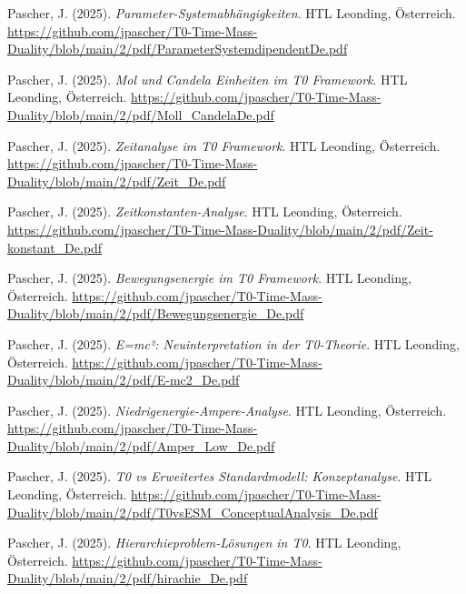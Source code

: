 \documentclass{article}
\begin{document}
\begin{thebibliography}{99}
		Pascher, J. (2025).
		\textit{Parameter-Systemabhängigkeiten}.
		HTL Leonding, Österreich.
		\url{https://github.com/jpascher/T0-Time-Mass-Duality/blob/main/2/pdf/ParameterSystemdipendentDe.pdf}
		
		Pascher, J. (2025).
		\textit{Mol und Candela Einheiten im T0 Framework}.
		HTL Leonding, Österreich.
		\url{https://github.com/jpascher/T0-Time-Mass-Duality/blob/main/2/pdf/Moll_CandelaDe.pdf}
		
		
		Pascher, J. (2025).
		\textit{Zeitanalyse im T0 Framework}.
		HTL Leonding, Österreich.
		\url{https://github.com/jpascher/T0-Time-Mass-Duality/blob/main/2/pdf/Zeit_De.pdf}
		
		Pascher, J. (2025).
		\textit{Zeitkonstanten-Analyse}.
		HTL Leonding, Österreich.
		\url{https://github.com/jpascher/T0-Time-Mass-Duality/blob/main/2/pdf/Zeit-konstant_De.pdf}
		
		Pascher, J. (2025).
		\textit{Bewegungsenergie im T0 Framework}.
		HTL Leonding, Österreich.
		\url{https://github.com/jpascher/T0-Time-Mass-Duality/blob/main/2/pdf/Bewegungsenergie_De.pdf}
		
		Pascher, J. (2025).
		\textit{E=mc²: Neuinterpretation in der T0-Theorie}.
		HTL Leonding, Österreich.
		\url{https://github.com/jpascher/T0-Time-Mass-Duality/blob/main/2/pdf/E-mc2_De.pdf}
		
		Pascher, J. (2025).
		\textit{Niedrigenergie-Ampere-Analyse}.
		HTL Leonding, Österreich.
		\url{https://github.com/jpascher/T0-Time-Mass-Duality/blob/main/2/pdf/Amper_Low_De.pdf}
		
		
		Pascher, J. (2025).
		\textit{T0 vs Erweitertes Standardmodell: Konzeptanalyse}.
		HTL Leonding, Österreich.
		\url{https://github.com/jpascher/T0-Time-Mass-Duality/blob/main/2/pdf/T0vsESM_ConceptualAnalysis_De.pdf}
		
		Pascher, J. (2025).
		\textit{Hierarchieproblem-Lösungen in T0}.
		HTL Leonding, Österreich.
		\url{https://github.com/jpascher/T0-Time-Mass-Duality/blob/main/2/pdf/hirachie_De.pdf}
		

\end{thebibliography}
\end{document}
